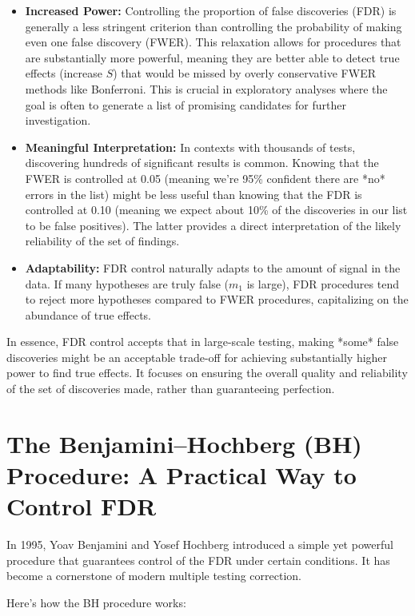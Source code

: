 \documentclass[12pt]{book}
\begin{document}
\begin{itemize}
    \item \textbf{Increased Power:} Controlling the proportion of false discoveries (FDR) is generally a less stringent criterion than controlling the probability of making even one false discovery (FWER). This relaxation allows for procedures that are substantially more powerful, meaning they are better able to detect true effects (increase $S$) that would be missed by overly conservative FWER methods like Bonferroni. This is crucial in exploratory analyses where the goal is often to generate a list of promising candidates for further investigation.
    \item \textbf{Meaningful Interpretation:} In contexts with thousands of tests, discovering hundreds of significant results is common. Knowing that the FWER is controlled at 0.05 (meaning we're 95\% confident there are *no* errors in the list) might be less useful than knowing that the FDR is controlled at 0.10 (meaning we expect about 10\% of the discoveries in our list to be false positives). The latter provides a direct interpretation of the likely reliability of the set of findings.
    \item \textbf{Adaptability:} FDR control naturally adapts to the amount of signal in the data. If many hypotheses are truly false ($m_1$ is large), FDR procedures tend to reject more hypotheses compared to FWER procedures, capitalizing on the abundance of true effects.
\end{itemize}

In essence, FDR control accepts that in large-scale testing, making *some* false discoveries might be an acceptable trade-off for achieving substantially higher power to find true effects. It focuses on ensuring the overall quality and reliability of the set of discoveries made, rather than guaranteeing perfection.

\section{The Benjamini–Hochberg (BH) Procedure: A Practical Way to Control FDR}
\label{sec:BH}
In 1995, Yoav Benjamini and Yosef Hochberg introduced a simple yet powerful procedure that guarantees control of the FDR under certain conditions. It has become a cornerstone of modern multiple testing correction.

Here's how the BH procedure works:
\end{document}
